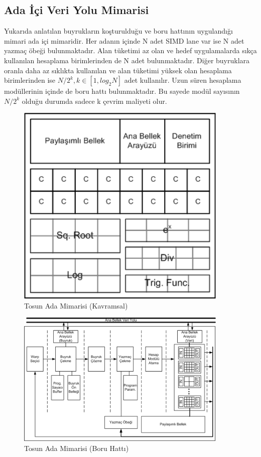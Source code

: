 \subsection{Ada İçi Veri Yolu Mimarisi}

Yukarıda anlatılan buyrukların koşturulduğu ve boru hattının uygulandığı mimari ada içi mimaridir. Her adanın içinde N adet SIMD lane var ise N adet yazmaç öbeği bulunmaktadır. Alan tüketimi az olan ve hedef uygulamalarda sıkça kullanılan hesaplama birimlerinden de N adet bulunmaktadır. Diğer buyruklara oranla daha az sıklıkta kullanılan ve alan tüketimi yüksek olan hesaplama birimlerinden ise $N/2^{k}, k\in[1,log_{2}N]$ adet kullanılır. Uzun süren hesaplama modüllerinin içinde de boru hattı bulunmaktadır. Bu sayede modül sayısının $N/2^{k}$ olduğu durumda sadece k çevrim maliyeti olur.\par
\begin{figure}[h]
\centering
\shorthandoff{=}
\includegraphics[width=0.9\textwidth]{gorsel/adaMimarisiEski.png}
\shorthandoff{=}
\caption{Tosun Ada Mimarisi (Kavramsal)}
\label{image:adaMimarisiEski}
\end{figure}

\begin{figure}[h]
\centering
\shorthandoff{=}
\includegraphics[width=0.9\textwidth]{gorsel/adaMimarisi.png}
\shorthandoff{=}
\caption{Tosun Ada Mimarisi (Boru Hattı)}
\label{image:adaMimarisi}
\end{figure}

